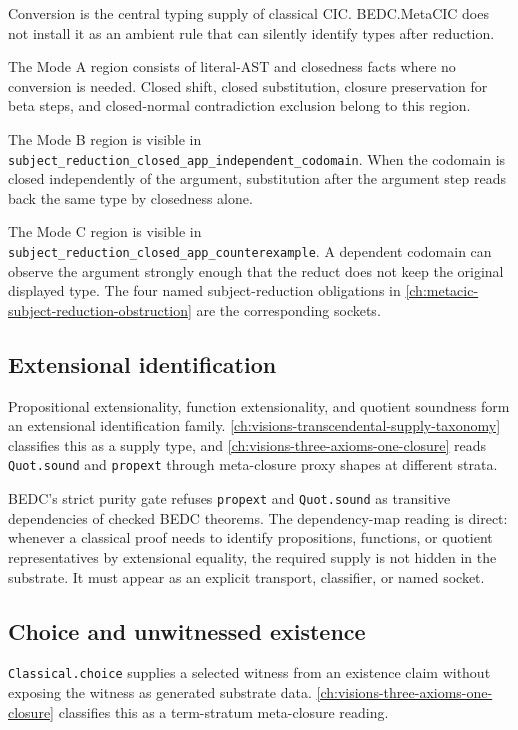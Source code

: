 Conversion is the central typing supply of classical CIC. BEDC.MetaCIC does not install it as an ambient rule that can silently identify types after reduction.

The Mode A region consists of literal-AST and closedness facts where no conversion is needed. Closed shift, closed substitution, closure preservation for beta steps, and closed-normal contradiction exclusion belong to this region.

The Mode B region is visible in \texttt{subject\_reduction\_closed\_app\_independent\_codomain}. When the codomain is closed independently of the argument, substitution after the argument step reads back the same type by closedness alone.

The Mode C region is visible in \texttt{subject\_reduction\_closed\_app\_counterexample}. A dependent codomain can observe the argument strongly enough that the reduct does not keep the original displayed type. The four named subject-reduction obligations in \autoref{ch:metacic-subject-reduction-obstruction} are the corresponding sockets.

\subsection{Extensional identification}
\label{subsec:bedc-axiom-dependency-map-extensional-identification}

Propositional extensionality, function extensionality, and quotient soundness form an extensional identification family. \autoref{ch:visions-transcendental-supply-taxonomy} classifies this as a supply type, and \autoref{ch:visions-three-axioms-one-closure} reads \texttt{Quot.sound} and \texttt{propext} through meta-closure proxy shapes at different strata.

BEDC's strict purity gate refuses \texttt{propext} and \texttt{Quot.sound} as transitive dependencies of checked BEDC theorems. The dependency-map reading is direct: whenever a classical proof needs to identify propositions, functions, or quotient representatives by extensional equality, the required supply is not hidden in the substrate. It must appear as an explicit transport, classifier, or named socket.

\subsection{Choice and unwitnessed existence}
\label{subsec:bedc-axiom-dependency-map-choice}

\texttt{Classical.choice} supplies a selected witness from an existence claim without exposing the witness as generated substrate data. \autoref{ch:visions-three-axioms-one-closure} classifies this as a term-stratum meta-closure reading.

